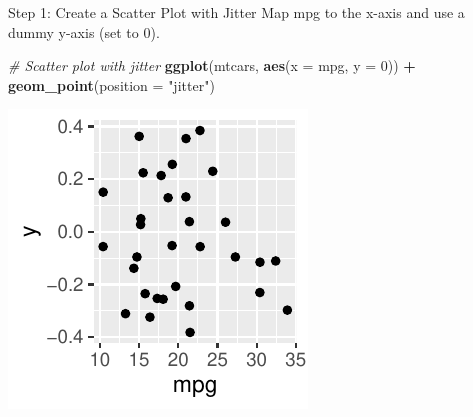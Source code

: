 \documentclass[
  ignorenonframetext,
]{beamer}
\newenvironment{Shaded}{\begin{snugshade}}{\end{snugshade}}
\newcommand{\AttributeTok}[1]{\textcolor[rgb]{0.13,0.29,0.53}{#1}}
\newcommand{\CommentTok}[1]{\textcolor[rgb]{0.56,0.35,0.01}{\textit{#1}}}
\newcommand{\DecValTok}[1]{\textcolor[rgb]{0.00,0.00,0.81}{#1}}
\newcommand{\FunctionTok}[1]{\textcolor[rgb]{0.13,0.29,0.53}{\textbf{#1}}}
\newcommand{\NormalTok}[1]{#1}
\newcommand{\SpecialCharTok}[1]{\textcolor[rgb]{0.81,0.36,0.00}{\textbf{#1}}}
\newcommand{\StringTok}[1]{\textcolor[rgb]{0.31,0.60,0.02}{#1}}
\begin{document}
\begin{frame}[fragile]{Step 1: Create a Scatter Plot with Jitter}
\label{step-1-create-a-scatter-plot-with-jitter}
Map mpg to the x-axis and use a dummy y-axis (set to 0).


\begin{Shaded}
\begin{Highlighting}[]
\CommentTok{\# Scatter plot with jitter}
\FunctionTok{ggplot}\NormalTok{(mtcars, }\FunctionTok{aes}\NormalTok{(}\AttributeTok{x =}\NormalTok{ mpg, }\AttributeTok{y =} \DecValTok{0}\NormalTok{)) }\SpecialCharTok{+} \FunctionTok{geom\_point}\NormalTok{(}\AttributeTok{position =} \StringTok{"jitter"}\NormalTok{)}
\end{Highlighting}
\end{Shaded}

\begin{center}\includegraphics[width=0.5\linewidth]{Figs/unnamed-chunk-31-1} \end{center}
\end{frame}
\end{document}
